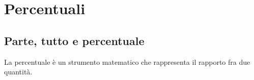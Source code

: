 \chapter{Percentuali}
\section{Parte, tutto e percentuale}
La percentuale è un strumento matematico che rappresenta il rapporto fra due quantità.